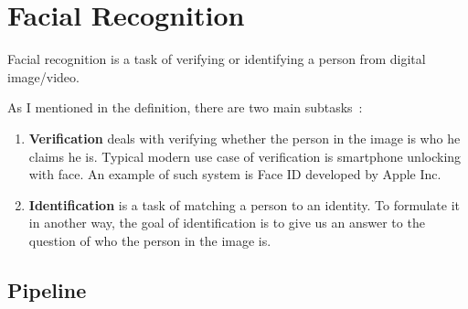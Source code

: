 \chapter{Facial Recognition}\label{ch:face-rec}
Facial recognition is a task of verifying or identifying a person from digital image/video.

As I mentioned in the definition, there are two main subtasks~\cite{FaceRec}:
\begin{enumerate}
    \item \textbf{Verification} deals with verifying whether the person in the image is who he claims he is.
    Typical modern use case of verification is smartphone unlocking with face.
    An example of such system is Face ID developed by Apple Inc.

    \item \textbf{Identification} is a task of matching a person to an identity.
    To formulate it in another way, the goal of identification is to give us an answer to the question of who the person
    in the image is.
\end{enumerate}

\section{Pipeline}\label{sec:pipeline}